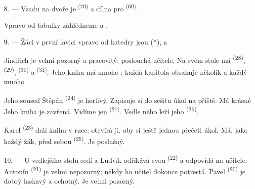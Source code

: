 8. --- Vzadu na dvoře je  \textsuperscript{(70)} a dílna pro
 \textsuperscript{(69)}.

Vpravo od tabulky zahlédneme   a .


\VUsaut{2.4mm}

\VUsaut{3.0mm}

9. --- Žáci v první lavici vpravo od katedry jsou  (*),
 a 

Jindřich je velmi pozorný a pracovitý; poslouchá učitele. Na svém stole má
 \textsuperscript{(28)},  \textsuperscript{(29)},
 \textsuperscript{(30)} a  \textsuperscript{(31)}. Jeho
kniha má mnoho ; každá kapitola obsahuje několik  a každý
 mnoho 

Jeho soused Štěpán \textsuperscript{(24)} je horlivý. Zapisuje si do sešitu úkol na příště. Má
krásné  Jeho kniha je zavřená. Vidíme jen 
\textsuperscript{(27)}. Vedle něho leží jeho  \textsuperscript{(26)}.

Karel \textsuperscript{(23)} drží knihu v ruce; otevírá ji, aby si ještě jednou přečetl úkol.
Má, jako každý žák, před sebou  \textsuperscript{(25)}. Je poslušný.

10. --- U vedlejšího stolu sedí  a  Ludvík odříkává
svou  \textsuperscript{(22)} a odpovídá na  učitele. Antonín
\textsuperscript{(21)} je velmi nepozorný; někdy ho učitel dokonce potrestá. Pavel
\textsuperscript{(20)} je dobrý  laskavý a ochotný. Je velmi pozorný.

\VUsaut{4.2mm}
\VUsaut{3.2mm}

